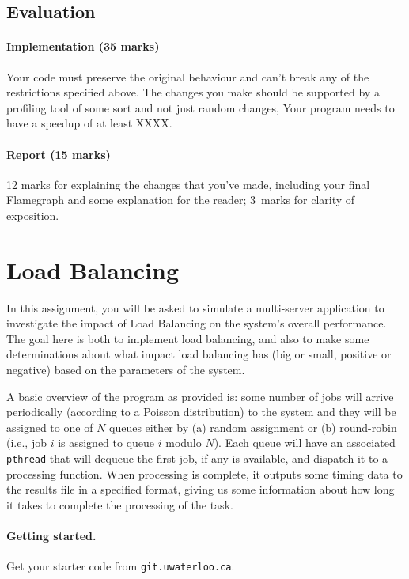 \documentclass[letterpaper,10pt]{article}
\begin{document}
\subsection{Evaluation}

\paragraph{Implementation (35 marks)} Your code must preserve the original behaviour and can't break any of the restrictions specified above. The changes you make should be supported by a profiling tool of some sort and not just random changes, Your program needs to have a speedup of at least XXXX.

\paragraph{Report (15 marks)} 12 marks for explaining the changes that you've made, including your final Flamegraph and some explanation for the reader; 3~marks for clarity of exposition. 

\section{Load Balancing}

In this assignment, you will be asked to simulate a multi-server application to investigate the impact of Load Balancing on the system's overall performance. The goal here is both to implement load balancing, and also to make some determinations about what impact load balancing has (big or small, positive or negative) based on the parameters of the system. 

A basic overview of the program as provided is: some number of jobs will arrive periodically (according to a Poisson distribution) to the system and they will be assigned to one of $N$ queues either by (a) random assignment or (b) round-robin (i.e., job $i$ is assigned to queue $i$ modulo $N$). Each queue will have an associated \texttt{pthread} that will dequeue the first job, if any is available, and dispatch it to a processing function. When processing is complete, it outputs some timing data to the results file in a specified format, giving us some information about how long it takes to complete the processing of the task.


\paragraph{Getting started.} Get your starter code from \texttt{git.uwaterloo.ca}.
\end{document}
